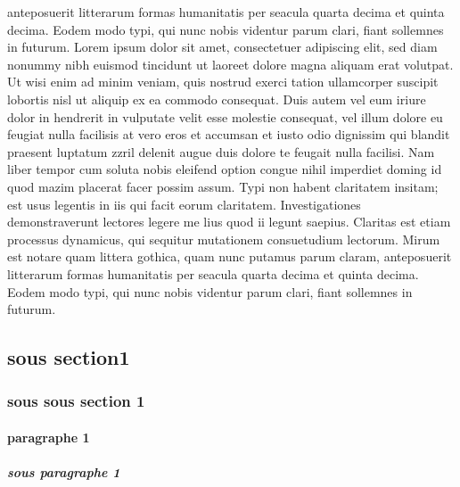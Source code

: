 \documentclass[12pt,a4paper, twoside]{report} %
\begin{document}
anteposuerit litterarum formas humanitatis per seacula quarta decima et quinta decima. Eodem modo typi, qui nunc nobis videntur parum clari, fiant sollemnes in futurum. Lorem ipsum dolor sit amet, consectetuer adipiscing elit, sed diam nonummy nibh euismod tincidunt ut laoreet dolore magna aliquam erat volutpat. Ut wisi enim ad minim veniam, quis nostrud exerci tation ullamcorper suscipit lobortis nisl ut aliquip ex ea commodo consequat. Duis autem vel eum iriure dolor in hendrerit in vulputate velit esse molestie consequat, vel illum dolore eu feugiat nulla facilisis at vero eros et accumsan et iusto odio dignissim qui blandit praesent luptatum zzril delenit augue duis dolore te feugait nulla facilisi. Nam liber tempor cum soluta nobis eleifend option congue nihil imperdiet doming id quod mazim placerat facer possim assum. Typi non habent claritatem insitam; est usus legentis in iis qui facit eorum claritatem. Investigationes demonstraverunt lectores legere me lius quod ii legunt saepius. Claritas est etiam processus dynamicus, qui sequitur mutationem consuetudium lectorum. Mirum est notare quam littera gothica, quam nunc putamus parum claram, anteposuerit litterarum formas humanitatis per seacula quarta decima et quinta decima. Eodem modo typi, qui nunc nobis videntur parum clari, fiant sollemnes in futurum.
\subsection{sous section1}
\subsubsection{sous sous section 1}
\paragraph{paragraphe 1}
\subparagraph{sous paragraphe 1}~~\\
\end{document}
